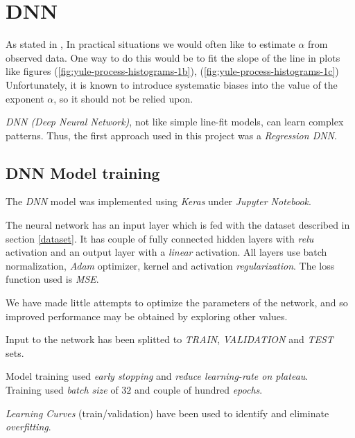 \documentclass[a4paper, 12pt]{report}
\begin{document}
\pagebreak
\section{DNN}
\par As stated in \cite{newman}, In practical situations we would often like to estimate $\alpha$ from observed data. One way to do this would be to fit the slope of the line in plots like figures (\ref{fig:yule-process-histograms-1b}), (\ref{fig:yule-process-histograms-1c}) Unfortunately, it is known to introduce systematic biases into the value of the exponent $\alpha$, so it should not be relied
upon.

\par \textit{DNN (Deep Neural Network)}, not like simple line-fit models, can learn complex patterns. Thus, the first approach used in this project was a \textit{Regression DNN}.

\subsection{DNN Model training}
The \textit{DNN} model was implemented using \textit{Keras} under \textit{Jupyter Notebook}.

\par The neural network has an input layer which is fed with the dataset described in section \ref{dataset}. It has couple of fully connected hidden layers with \textit{relu} activation and an output layer with a \textit{linear} activation. All layers use batch normalization, \textit{Adam} optimizer, kernel and activation \textit{regularization}. The loss function used is \textit{MSE}.

\par We have made little attempts to optimize the parameters of the network, and
so improved performance may be obtained by exploring other values.

\par Input to the network has been splitted to \textit{TRAIN}, \textit{VALIDATION} and \textit{TEST} sets.

\par Model training used \textit{early stopping} and \textit{reduce learning-rate on plateau}.\\
Training used \textit{batch size} of $32$ and couple of hundred \textit{epochs}.

\textit{Learning Curves} (train/validation) have been used to identify and eliminate \textit{overfitting}.

\pagebreak
\end{document}
